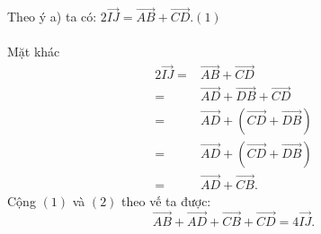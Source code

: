 \begin{bt}
{\begin{listEX}
			\item Theo ý a) ta có: $2\overrightarrow{IJ} = \overrightarrow{AB} + \overrightarrow{CD}$.\hfill$(1)$\\\\
			Mặt khác 
			{\allowdisplaybreaks
				\begin{align*}
					2\overrightarrow{IJ} =& \overrightarrow{AB} + \overrightarrow{CD}\\
					=&\overrightarrow{AD} + \overrightarrow{DB} + \overrightarrow{CD}\\
					=&\overrightarrow{AD} + (\overrightarrow{CD} + \overrightarrow{DB})\\
					=&\overrightarrow{AD} + (\overrightarrow{CD} + \overrightarrow{DB})\\
					=&\overrightarrow{AD} + \overrightarrow{CB}.\tag{2}
			\end{align*}}
			Cộng $(1)$ và $(2)$ theo vế ta được: 
			\[\overrightarrow{AB} + \overrightarrow{AD} + \overrightarrow{CB} + \overrightarrow{CD}= 4\overrightarrow{IJ}.\]
		\end{listEX}
	}
\end{bt}

